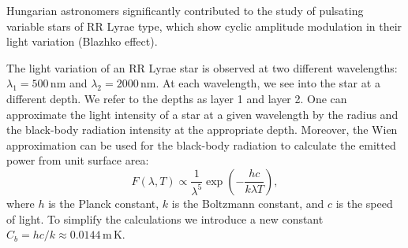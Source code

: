 Hungarian astronomers significantly contributed to the study of pulsating
variable stars of RR Lyrae type, which show cyclic amplitude modulation in
their light variation (Blazhko effect).

The light variation of an RR Lyrae star is observed at two different
wavelengths: $\lambda_1 = 500$\,nm and $\lambda_2 = 2000$\,nm. At each
wavelength, we see into the star at a different depth. We refer to the depths
as layer 1 and layer 2. One can approximate the light intensity of a star at
a given wavelength by the radius and the black-body radiation intensity at
the appropriate depth. Moreover, the Wien approximation can be used for the
black-body radiation to calculate the emitted power from unit surface area:
\[ F(\lambda, T) \propto \frac{1}{\lambda^5}
   \exp\left(-\frac{hc}{k\lambda T}\right), \]
where $h$ is the Planck constant, $k$ is the Boltzmann constant, and $c$ is
the speed of light. To simplify the calculations we introduce a new constant
$C_b = hc/k \approx 0.0144$\,m\,K.

